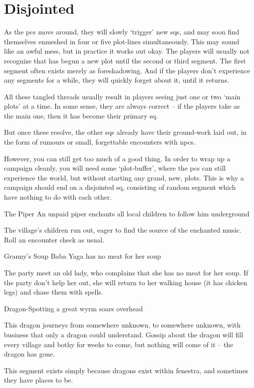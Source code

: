 \section{Disjointed }

\begin{multicols}{2}

\noindent
As the \glspl{pc} move around, they will slowly `trigger' new \glspl{sq}, and may soon find themselves enmeshed in four or five plot-lines simultaneously.
This may sound like an awful mess, but in practice it works out okay.
The players will usually not recognize that  has begun a new plot until the second or third \gls{segment}.
The first \gls{segment} often exists merely as foreshadowing.
And if the players don't experience any \glspl{segment} for a while, they will quickly forget about it, until it returns.

All these tangled threads usually result in players seeing just one or two `main plots' at a time.
In some sense, they are always correct -- if the players take  as the main one, then it has become their primary \gls{sq}.

But once these resolve, the other \glspl{sq} already have their ground-work laid out, in the form of rumours or small, forgettable encounters with \glspl{npc}.

However, you can still get too much of a good thing.
In order to wrap up a campaign cleanly, you will need some `plot-buffer', where the \glspl{pc} can still experience the world, but without starting any grand, new, plots.
This is why a campaign should end on a disjointed \gls{sq}, consisting of random \gls{segment} which have nothing to do with each other.


{The Piper}%
{An unpaid piper enchants all local children to follow him underground}%

The \gls{village}'s children run out, eager to find the source of the enchanted music.
Roll an encounter check as usual.

{Granny's Soup}%
{Baba Yaga has no meat for her soup}%

The party meet an old lady, who complains that she has no meat for her soup.
If the party don't help her out, she will return to her walking house (it has chicken legs) and chase them with spells.

{Dragon-Spotting}%
{a great wyrm soars overhead}%

This dragon journeys from somewhere unknown, to somewhere unknown, with business that only a dragon could understand.
Gossip about the dragon will fill every \gls{village} and \gls{bothy} for weeks to come, but nothing will come of it -- the dragon has gone.

This \gls{segment} exists simply because dragons exist within \gls{fenestra}, and sometimes they have places to be.

\stopcontents[sq]

\end{multicols}

